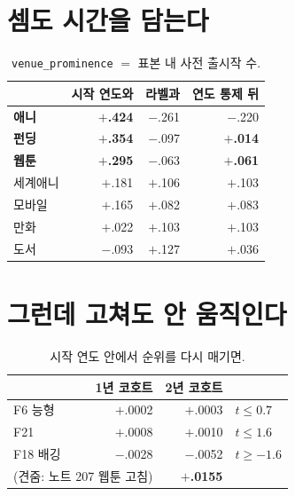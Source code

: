 \documentclass[10pt]{article}
\begin{document}

\section{셈도 시간을 담는다}

\begin{table}[t]
\centering\tsize
\caption{\texttt{venue\_prominence} $=$ 표본 내 사전 출시작 수.}
\begin{tabular}{lrrr}
\toprule
& 시작 연도와 & 라벨과 & 연도 통제 뒤 \\
\midrule
\textbf{애니} & \textbf{$+$.424} & $-$.261 & $-$.220 \\
\textbf{펀딩} & \textbf{$+$.354} & $-$.097 & \textbf{$+$.014} \\
\textbf{웹툰} & \textbf{$+$.295} & $-$.063 & \textbf{$+$.061} \\
세계애니 & $+$.181 & $+$.106 & $+$.103 \\
모바일 & $+$.165 & $+$.082 & $+$.083 \\
만화 & $+$.022 & $+$.103 & $+$.103 \\
도서 & $-$.093 & $+$.127 & $+$.036 \\
\bottomrule
\end{tabular}
\end{table}


\section{그런데 고쳐도 안 움직인다}

\begin{table}[t]
\centering\tsize
\caption{시작 연도 안에서 순위를 다시 매기면.}
\begin{tabular}{lrrl}
\toprule
& 1년 코호트 & 2년 코호트 & \\
\midrule
F6 능형 & $+$.0002 & $+$.0003 & $t{\le}0.7$ \\
F21 & $+$.0008 & $+$.0010 & $t{\le}1.6$ \\
F18 배깅 & $-$.0028 & $-$.0052 & $t{\ge}-1.6$ \\
\midrule
\multicolumn{2}{l}{(견줌: 노트 207 웹툰 고침)} & \textbf{$+$.0155} & \\
\bottomrule
\end{tabular}
\end{table}
\end{document}
